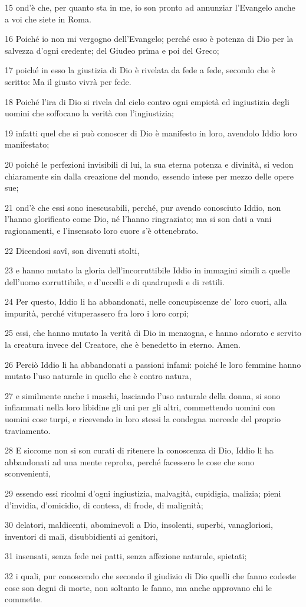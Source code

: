 \par 15 ond'è che, per quanto sta in me, io son pronto ad annunziar l'Evangelo anche a voi che siete in Roma.
\par 16 Poiché io non mi vergogno dell'Evangelo; perché esso è potenza di Dio per la salvezza d'ogni credente; del Giudeo prima e poi del Greco;
\par 17 poiché in esso la giustizia di Dio è rivelata da fede a fede, secondo che è scritto: Ma il giusto vivrà per fede.
\par 18 Poiché l'ira di Dio si rivela dal cielo contro ogni empietà ed ingiustizia degli uomini che soffocano la verità con l'ingiustizia;
\par 19 infatti quel che si può conoscer di Dio è manifesto in loro, avendolo Iddio loro manifestato;
\par 20 poiché le perfezioni invisibili di lui, la sua eterna potenza e divinità, si vedon chiaramente sin dalla creazione del mondo, essendo intese per mezzo delle opere sue;
\par 21 ond'è che essi sono inescusabili, perché, pur avendo conosciuto Iddio, non l'hanno glorificato come Dio, né l'hanno ringraziato; ma si son dati a vani ragionamenti, e l'insensato loro cuore s'è ottenebrato.
\par 22 Dicendosi savî, son divenuti stolti,
\par 23 e hanno mutato la gloria dell'incorruttibile Iddio in immagini simili a quelle dell'uomo corruttibile, e d'uccelli e di quadrupedi e di rettili.
\par 24 Per questo, Iddio li ha abbandonati, nelle concupiscenze de' loro cuori, alla impurità, perché vituperassero fra loro i loro corpi;
\par 25 essi, che hanno mutato la verità di Dio in menzogna, e hanno adorato e servito la creatura invece del Creatore, che è benedetto in eterno. Amen.
\par 26 Perciò Iddio li ha abbandonati a passioni infami: poiché le loro femmine hanno mutato l'uso naturale in quello che è contro natura,
\par 27 e similmente anche i maschi, lasciando l'uso naturale della donna, si sono infiammati nella loro libidine gli uni per gli altri, commettendo uomini con uomini cose turpi, e ricevendo in loro stessi la condegna mercede del proprio traviamento.
\par 28 E siccome non si son curati di ritenere la conoscenza di Dio, Iddio li ha abbandonati ad una mente reproba, perché facessero le cose che sono sconvenienti,
\par 29 essendo essi ricolmi d'ogni ingiustizia, malvagità, cupidigia, malizia; pieni d'invidia, d'omicidio, di contesa, di frode, di malignità;
\par 30 delatori, maldicenti, abominevoli a Dio, insolenti, superbi, vanagloriosi, inventori di mali, disubbidienti ai genitori,
\par 31 insensati, senza fede nei patti, senza affezione naturale, spietati;
\par 32 i quali, pur conoscendo che secondo il giudizio di Dio quelli che fanno codeste cose son degni di morte, non soltanto le fanno, ma anche approvano chi le commette.

